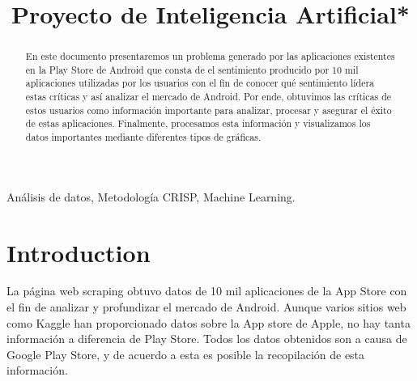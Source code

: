 \documentclass[conference]{IEEEtran}
\begin{document}
\title{Proyecto de Inteligencia Artificial*}

\author{
\and
{}
\and
{}
}

\maketitle

\begin{abstract}
En este documento presentaremos un problema generado por las aplicaciones existentes en la Play Store de Android que consta de el sentimiento producido por 10 mil aplicaciones utilizadas por los usuarios con el fin de conocer qué sentimiento lídera estas críticas y así analizar el mercado de Android. Por ende, obtuvimos las críticas de estos usuarios como información importante para analizar, procesar y asegurar el éxito de estas aplicaciones. Finalmente, procesamos esta información y visualizamos los datos importantes mediante diferentes tipos de gráficas.\\
\end{abstract}

\begin{IEEEkeywords}
Análisis de datos, Metodología CRISP, Machine Learning.
\end{IEEEkeywords}

\section{Introduction}
La página web scraping obtuvo datos de 10 mil aplicaciones de la App Store con el fin de analizar y profundizar el mercado de Android. Aunque varios sitios web como Kaggle han proporcionado datos sobre la App store de Apple, no hay tanta información a diferencia de Play Store. Todos los datos obtenidos son a causa de Google Play Store, y de acuerdo a esta es posible la recopilación de esta información.
\end{document}
